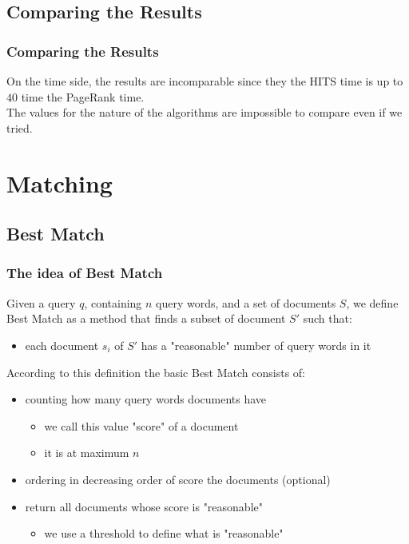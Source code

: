 \documentclass{beamer}
\begin{document}
\subsection{Comparing the Results}
\begin{frame}
\frametitle{Comparing the Results}
On the time side, the results are incomparable since they the HITS time is up to $40$ time the PageRank time.\\
\medskip
The values for the nature of the algorithms are impossible to compare even if we tried.
\end{frame}

\section{Matching}
\subsection{Best Match}
\begin{frame}
\frametitle{The idea of Best Match}
Given a query $q$, containing $n$ query words, and a set of documents $S$, we define Best Match as a method that finds a subset of document $S'$ such that:
\begin{itemize}
	\item each document $s_i$ of $S'$ has a "reasonable" number of query words in it
\end{itemize}
\medskip
According to this definition the basic Best Match consists of:
\begin{itemize}
	\item counting how many query words documents have
	\begin{itemize}
		\item we call this value "score" of a document
		\item it is at maximum $n$
	\end{itemize}
	\item ordering in decreasing order of score the documents (optional)
	\item return all documents whose score is "reasonable"
	\begin{itemize}
		\item we use a threshold to define what is "reasonable"
	\end{itemize}
\end{itemize}
\end{frame}
\end{document}
